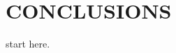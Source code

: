 \documentclass[letterpaper, 10 pt, conference]{ieeeconf}  %
\begin{document}
    \section{CONCLUSIONS}
    start here.









%
%
%
%
%
%
%
\end{document}
